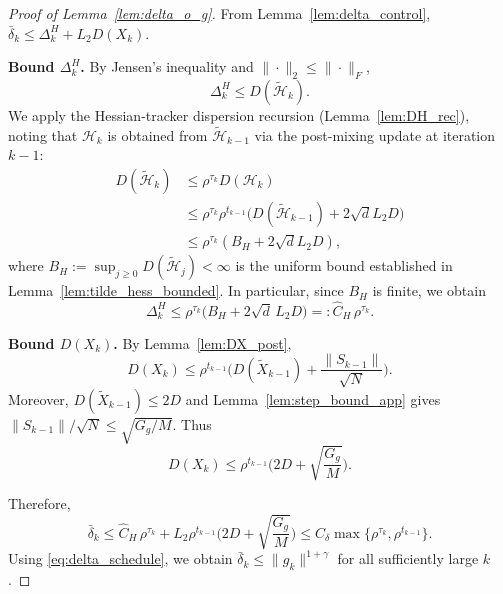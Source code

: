 \documentclass[review,onefignum,onetabnum]{siamart171218}
\begin{document}
	\begin{proof}[Proof of Lemma~\ref{lem:delta_o_g}]
		From Lemma~\ref{lem:delta_control}, $\bar\delta_k\le \Delta_k^H+L_2D(X_k)$.
		
		\smallskip
		\noindent\textbf{Bound $\Delta_k^H$.}
		By Jensen's inequality and $\|\cdot\|_2\le \|\cdot\|_F$,
		\[
		\Delta_k^H\le D(\tilde{\mathcal H}_k).
		\]
		We apply the Hessian-tracker dispersion recursion (Lemma~\ref{lem:DH_rec}),
		noting that $\mathcal H_k$ is obtained from $\tilde{\mathcal H}_{k-1}$
		via the post-mixing update at iteration $k{-}1$:
		\begin{align*}
			D(\tilde{\mathcal H}_k)
			&\le \rho^{\tau_k}D(\mathcal H_k)\\
			&\le \rho^{\tau_k}\rho^{t_{k-1}}\bigl(D(\tilde{\mathcal H}_{k-1})
			\!+\!2\sqrt{d}L_2D\bigr)\\
			&\le \rho^{\tau_k}(B_H\!+\!2\sqrt{d}L_2D),
		\end{align*}
		where $B_H:=\sup_{j\ge 0}D(\tilde{\mathcal H}_j)<\infty$ is the uniform bound
		established in Lemma~\ref{lem:tilde_hess_bounded}.
		In particular, since $B_H$ is finite, we obtain
		\[
		\Delta_k^H\le \rho^{\tau_k}\big(B_H+2\sqrt{d}\,L_2D\big)
		=:\hat C_H\,\rho^{\tau_k}.
		\]
		
		\smallskip
		\noindent\textbf{Bound $D(X_k)$.}
		By Lemma~\ref{lem:DX_post},
		\[
		D(X_k)\le \rho^{t_{k-1}}\Big(D(\tilde X_{k-1})+\frac{\|S_{k-1}\|}{\sqrt N}\Big).
		\]
		Moreover, $D(\tilde X_{k-1})\le 2D$ and Lemma~\ref{lem:step_bound_app} gives $\|S_{k-1}\|/\sqrt N\le \sqrt{G_g/M}$.
		Thus
		\[
		D(X_k)\le \rho^{t_{k-1}}\Big(2D+\sqrt{\frac{G_g}{M}}\Big).
		\]
		
		\smallskip
		Therefore,
		\[
		\bar\delta_k\le \hat C_H\,\rho^{\tau_k}
		+L_2\rho^{t_{k-1}}\Big(2D+\sqrt{\frac{G_g}{M}}\Big)
		\le C_\delta\max\{\rho^{\tau_k},\rho^{t_{k-1}}\}.
		\]
		Using \eqref{eq:delta_schedule}, we obtain $\bar\delta_k\le \|g_k\|^{1+\gamma}$ for all sufficiently large $k$.
	\end{proof}
	
\end{document}
